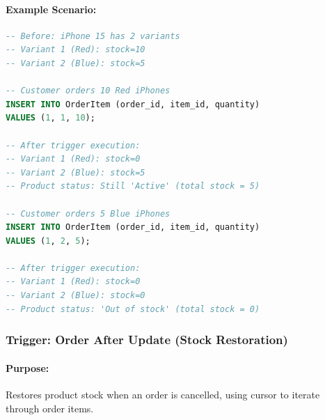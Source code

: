 \paragraph{Example Scenario:}

\begin{lstlisting}[language=SQL]
-- Before: iPhone 15 has 2 variants
-- Variant 1 (Red): stock=10
-- Variant 2 (Blue): stock=5

-- Customer orders 10 Red iPhones
INSERT INTO OrderItem (order_id, item_id, quantity)
VALUES (1, 1, 10);

-- After trigger execution:
-- Variant 1 (Red): stock=0
-- Variant 2 (Blue): stock=5
-- Product status: Still 'Active' (total stock = 5)

-- Customer orders 5 Blue iPhones
INSERT INTO OrderItem (order_id, item_id, quantity)
VALUES (1, 2, 5);

-- After trigger execution:
-- Variant 1 (Red): stock=0
-- Variant 2 (Blue): stock=0
-- Product status: 'Out of stock' (total stock = 0)
\end{lstlisting}

\subsubsection{Trigger: Order After Update (Stock Restoration)}

\paragraph{Purpose:} Restores product stock when an order is cancelled, using cursor to iterate through order items.

